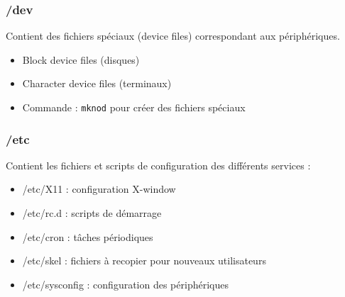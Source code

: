 \documentclass[12pt,a4paper]{article}
\begin{document}

\subsubsection{/dev}
Contient des fichiers sp\'eciaux (device files) correspondant aux p\'eriph\'eriques.
\begin{itemize}
    \item Block device files (disques) %
    \item Character device files (terminaux) %
    \item Commande : \texttt{mknod} pour cr\'eer des fichiers sp\'eciaux %
\end{itemize}


\subsubsection{/etc}
Contient les fichiers et scripts de configuration des diff\'erents services :
\begin{itemize}
    \item /etc/X11 : configuration X-window %
    \item /etc/rc.d : scripts de d\'emarrage %
    \item /etc/cron : t\^aches p\'eriodiques %
    \item /etc/skel : fichiers \`a recopier pour nouveaux utilisateurs %
    \item /etc/sysconfig : configuration des p\'eriph\'eriques %
\end{itemize}
\end{document}
